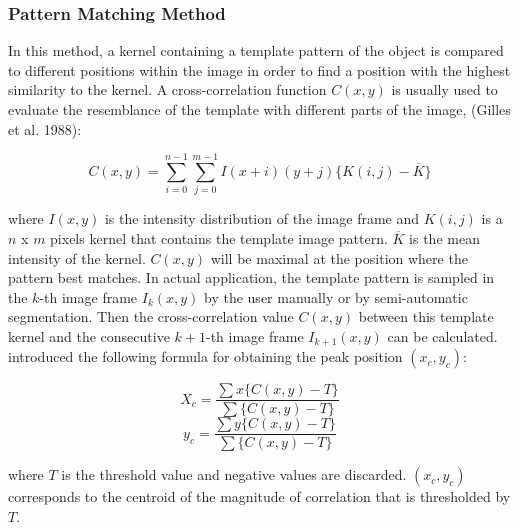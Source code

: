 \subsubsection{Pattern Matching Method}

In this method, a kernel containing a template pattern of the object is
compared to different positions within the image in order to find a
position with the highest similarity to the kernel. A cross-correlation
function $C(x,y)$ is usually used to evaluate the resemblance of
the template with different parts of the image, (Gilles et al. 1988):

\begin{equation}
\label{eq:simplecorrelation}
C(x,y)=\sum_{i=0}^{n-1}\sum_{j=0}^{m-1}I(x+i)(y+j)\{K(i,j)-\overline{K}\}
\end{equation}


where $I(x,y)$ is the intensity distribution of the image frame
and $K(i,j)$ is a $n$ x $m$ pixels kernel that
contains the template image pattern. 
$\overline{K}$
is the mean intensity of the kernel. $C(x,y)$ will be maximal at
the position where the pattern best matches. In actual application, the
template pattern is sampled in the $k$-th image frame
$I_{k}(x,y)$ by the user manually
or by semi-automatic segmentation. Then the cross-correlation value
$C(x, y)$ between this template kernel and the consecutive
$k+1$-th image frame
$I_{k+1}(x,y)$ can be calculated.
\citet{gellesNAT1988} introduced the following formula for
obtaining the peak position $(x_{c}, y_{c})$:

\begin{equation}
X_{c}=\frac{\sum{x\{C(x,y)-T\}}}{\sum{\{C(x,y)-T\}}}
\end{equation}
\begin{equation}
y_{c}=\frac{\sum{y\{C(x,y)-T\}}}{\sum{\{C(x,y)-T\}}}
\end{equation}

where $T$ is the threshold value and negative values are
discarded. 
 $(x_{c}, y_{c})$
 corresponds to the centroid of
the magnitude of correlation that is thresholded by $T$. 

